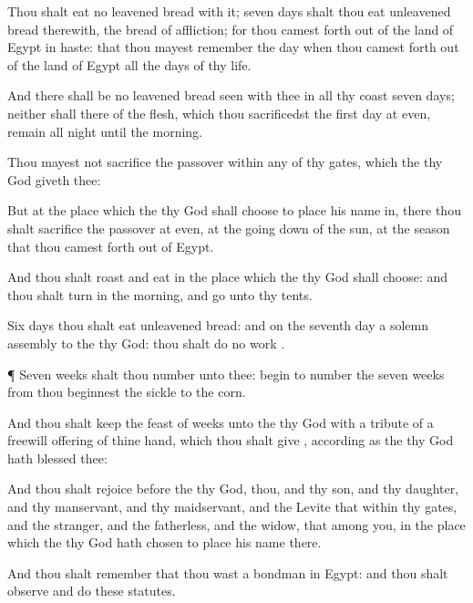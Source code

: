 {Thou shalt
eat no leavened
bread with it;
seven
days shalt thou
eat unleavened
bread therewith,
{} the
bread of
affliction; for thou camest
forth out of the
land of
Egypt in
haste: that thou mayest
remember the
day when thou camest
forth out of the
land of
Egypt all the
days of thy
life.

And there shall be no leavened
bread
seen with thee in all thy
coast
seven
days; neither shall there
{} of the
flesh, which thou
sacrificedst the
first
day at
even,
remain all night until the
morning.

Thou
mayest not
sacrifice the
passover within
any of thy
gates, which the
{} thy
God
giveth thee:

But at the
place which the
{} thy
God shall
choose to
place his
name in, there thou shalt
sacrifice the
passover at
even, at the going
down of the
sun, at the
season that thou camest
forth out of
Egypt.

And thou shalt
roast and
eat
{} in the
place which the
{} thy
God shall
choose: and thou shalt
turn in the
morning, and
go unto thy
tents.

Six
days thou shalt
eat unleavened
bread: and on the
seventh
day
{} a solemn
assembly to the
{} thy
God: thou shalt
do no
work
{}.


\par }{\PP {}¶
Seven
weeks shalt thou
number unto thee:
begin to
number the
seven
weeks from
{} thou
beginnest
{} the
sickle to the
corn.

And thou shalt
keep the
feast of
weeks unto the
{} thy
God with a
tribute of a freewill
offering of thine
hand, which thou shalt
give
{}, according as the
{} thy
God hath
blessed thee:

And thou shalt
rejoice
before the
{} thy
God, thou, and thy
son, and thy
daughter, and thy
manservant, and thy
maidservant, and the
Levite that
{} within thy
gates, and the
stranger, and the
fatherless, and the
widow, that
{}
among you, in the
place which the
{} thy
God hath
chosen to
place his
name there.

And thou shalt
remember that thou wast a
bondman in
Egypt: and thou shalt
observe and
do these
statutes.


}

